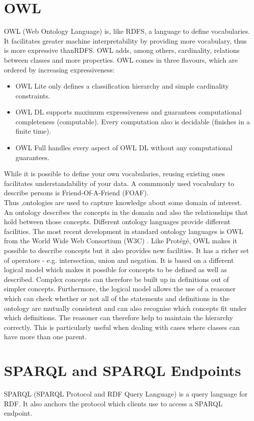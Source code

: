 \documentclass[a4paper,12pt,oneside]{report}
\begin{document}
{{{\section{OWL}
{ OWL  (Web Ontology Language) is, like RDFS, a language to define vocabularies. It facilitates greater machine interpretability by providing more vocabulary, thus is more expressive thanRDFS. OWL adds, among others, cardinality, relations between classes and more properties.
OWL comes in three flavours, which are ordered by increasing expressiveness:
\begin{itemize}
\item {OWL Lite only defines a classification hierarchy and simple cardinality constraints. }
\item { OWL DL supports maximum expressiveness and guarantees computational completeness
(computable). Every computation also is decidable (finishes in a finite time).}
\item { OWL Full handles every aspect of OWL DL without any computational guarantees.}
\end{itemize}
While it is possible to define your own vocabularies, reusing existing ones facilitates understandability of your data. A commmonly used vocabulary to describe persons is Friend-Of-A-Friend (FOAF).\\
Thus ,ontologies are used to capture knowledge about some domain of interest. An ontology describes the concepts in the domain and also the relationships that hold between those concepts. Different ontology languages provide different facilities. The most recent development in standard ontology languages is OWL from the World Wide Web Consortium (W3C) . Like Protégé, OWL makes it possible to describe concepts but it also provides new facilities. It has a richer set of operators - e.g. intersection, union and negation. It is based on a different logical model which makes it possible for concepts to be defined as well as described. Complex concepts can therefore be built up in definitions out of simpler concepts. Furthermore, the logical model allows the use of a reasoner which can check whether or not all of the statements and definitions in the ontology are mutually consistent and can also recognise which concepts fit under which definitions. The reasoner can therefore help to maintain the hierarchy correctly. This is particularly useful when dealing with cases where classes can have more than one parent.}
\section{SPARQL and SPARQL Endpoints}
SPARQL (SPARQL Protocol and RDF Query Language) is a query language for RDF. It also anchors the protocol which clients use to access a SPARQL endpoint.
}}}
\end{document}
